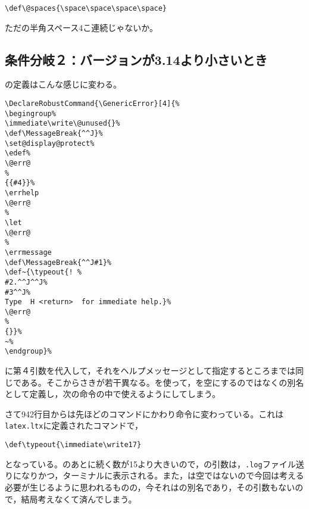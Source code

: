 \documentclass[autodetect-engine,dvipdfmx]{jsarticle}
\begin{document}
\latexltx
\begin{lstlisting}[firstnumber=1040]
\def\@spaces{\space\space\space\space}
\end{lstlisting}

ただの半角スペース4こ連続じゃないか。

\subsection{条件分岐２：バージョンが3.14より小さいとき}

の定義はこんな感じに変わる。

\latexltx
\begin{lstlisting}[firstnumber=928]
\DeclareRobustCommand{\GenericError}[4]{%
\begingroup%
\immediate\write\@unused{}%
\def\MessageBreak{^^J}%
\set@display@protect%
\edef%
\@err@                                                                 %
{{#4}}%
\errhelp
\@err@                                                                 %
\let
\@err@                                                                 %
\errmessage
\def\MessageBreak{^^J#1}%
\def~{\typeout{! %
#2.^^J^^J%
#3^^J%
Type  H <return>  for immediate help.}%
\@err@                                                                 %
{}}%
~%
\endgroup}%
\end{lstlisting}

に第４引数を代入して，それをヘルプメッセージとして指定するところまでは同じである。そこからさきが若干異なる。を使って，を空にするのではなくの別名として定義し，次の命令の中で使えるようにしてしまう。

さて942行目からは先ほどのコマンドにかわり命令に変わっている。これは\texttt{latex.ltx}に定義されたコマンドで，

\latexltx
\begin{lstlisting}[firstnumber=93]
\def\typeout{\immediate\write17}
\end{lstlisting}

となっている。のあとに続く数が15より大きいので，の引数は，\texttt{.log}ファイル送りになりかつ，ターミナルに表示される。また，は空ではないので今回は考える必要が生じるように思われるものの，今それはの別名であり，その引数もないので，結局考えなくて済んでしまう。
\end{document}
